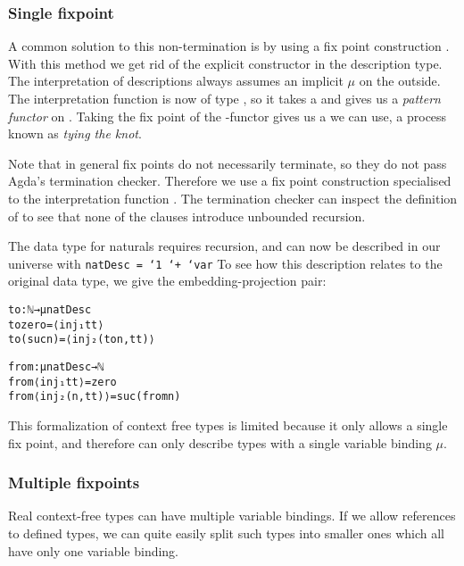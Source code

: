 \subsubsection{Single fixpoint}\label{sec:lit-cft-single}

A common solution to this non-termination is by using a fix point
construction .
With this method we get rid of the explicit  constructor in the
description type.
The interpretation of descriptions always assumes an implicit $μ$ on
the outside.
The interpretation function  is now of type  
  , so it takes a  and gives us a
\emph{pattern functor} on .
Taking the fix point of the -functor gives us a  we can
use, a process known as \emph{tying the knot}.


Note that in general fix points do not necessarily terminate, so they
do not pass Agda's termination checker.
Therefore we use a fix point construction specialised to
the interpretation function .
The termination checker can inspect the definition of  to see
that none of the clauses introduce unbounded recursion.

\begin{example}
The data type for naturals requires recursion, and can now be
described in our universe with \texttt{natDesc = `1 `+ `var}
To see how this description relates to the original data type, we give
the embedding-projection pair:

\begin{alltt}
to : ℕ → μ natDesc
to zero = ⟨ inj₁ tt ⟩
to (suc n) = ⟨ inj₂ (to n , tt) ⟩

from : μ natDesc → ℕ
from ⟨ inj₁ tt ⟩ = zero
from ⟨ inj₂ (n , tt) ⟩ = suc (from n)
\end{alltt}
\end{example}

This formalization of context free types is limited because it only
allows a single fix point, and therefore can only describe types with
a single variable binding $μ$.

\subsubsection{Multiple fixpoints}\label{sec:lit-cft-multi}

Real context-free types can have multiple variable bindings.
If we allow references to defined types, we can quite easily split
such types into smaller ones which all have only one variable
binding.

